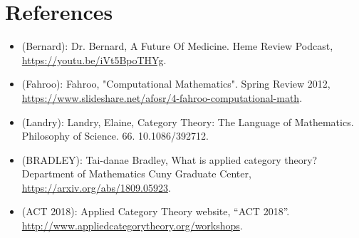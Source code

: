 \section*{References}

\begin{itemize}

\item (Bernard): Dr. Bernard, A Future Of Medicine. Heme Review Podcast, \url{https://youtu.be/iVt5BpoTHYg}.

\item (Fahroo): Fahroo, "Computational Mathematics". Spring Review 2012, \url{https://www.slideshare.net/afosr/4-fahroo-computational-math}.

\item (Landry): Landry, Elaine, Category Theory: The Language of Mathematics. Philosophy of Science. 66. 10.1086/392712.


\item (BRADLEY): Tai-danae Bradley, What is applied category theory? Department of Mathematics Cuny Graduate Center, \url{https://arxiv.org/abs/1809.05923}.


\item (ACT 2018): Applied Category Theory website, “ACT 2018”. \url{http://www.appliedcategorytheory.org/workshops}.

\end{itemize}
